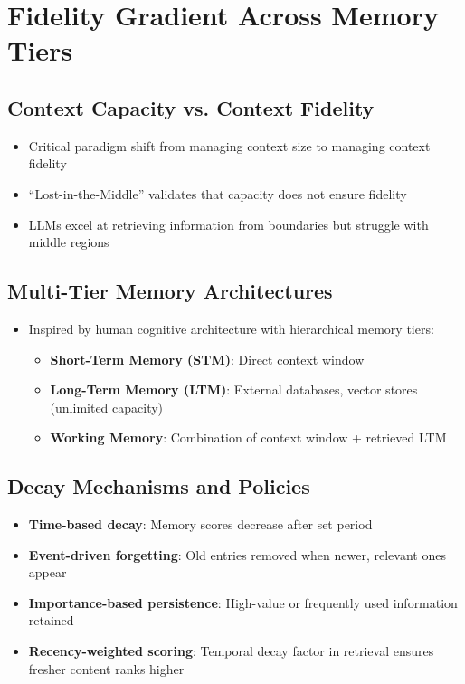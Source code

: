 \documentclass[11pt,letterpaper]{article}
\begin{document}
\section{Fidelity Gradient Across Memory Tiers}

\subsection{Context Capacity vs. Context Fidelity}

\begin{itemize}[leftmargin=*]
\item Critical paradigm shift from managing context size to managing context fidelity
\item ``Lost-in-the-Middle'' validates that capacity does not ensure fidelity
\item LLMs excel at retrieving information from boundaries but struggle with middle regions
\end{itemize}

\subsection{Multi-Tier Memory Architectures}

\begin{itemize}[leftmargin=*]
\item Inspired by human cognitive architecture with hierarchical memory tiers:
  \begin{itemize}
  \item \textbf{Short-Term Memory (STM)}: Direct context window
  \item \textbf{Long-Term Memory (LTM)}: External databases, vector stores (unlimited capacity)
  \item \textbf{Working Memory}: Combination of context window + retrieved LTM
  \end{itemize}
\end{itemize}

\subsection{Decay Mechanisms and Policies}

\begin{itemize}[leftmargin=*]
\item \textbf{Time-based decay}: Memory scores decrease after set period
\item \textbf{Event-driven forgetting}: Old entries removed when newer, relevant ones appear
\item \textbf{Importance-based persistence}: High-value or frequently used information retained
\item \textbf{Recency-weighted scoring}: Temporal decay factor in retrieval ensures fresher content ranks higher
\end{itemize}
\end{document}
